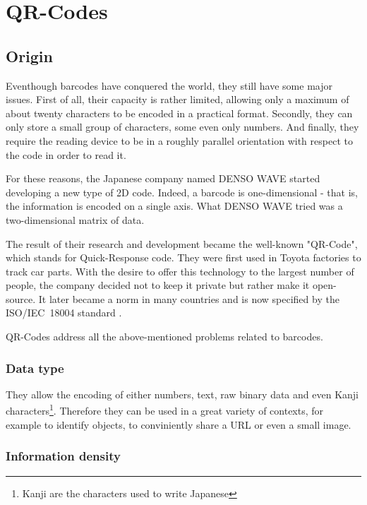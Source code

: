 \chapter{QR-Codes}
\label{chap:qr_origin}

\section{Origin}
\label{sec:qr_origin}

Eventhough barcodes have conquered the world, they still have some major issues.
First of all, their capacity is rather limited, allowing only a maximum of about twenty characters to be encoded in a practical format.
Secondly, they can only store a small group of characters, some even only numbers.
And finally, they require the reading device to be in a roughly parallel orientation with respect to the code in order to read it.

For these reasons, the Japanese company named DENSO WAVE started developing a new type of 2D code.
Indeed, a barcode is one-dimensional - that is, the information is encoded on a single axis.
What DENSO WAVE tried was a two-dimensional matrix of data.

The result of their research and development became the well-known "QR-Code", which stands for Quick-Response code. They were first used in Toyota factories to track car parts\cite{qrcode_history}.
With the desire to offer this technology to the largest number of people, the company decided not to keep it private but rather make it open-source.
It later became a norm in many countries and is now specified by the ISO/IEC~18004 standard \cite{ISO18004}.

QR-Codes address all the above-mentioned problems related to barcodes.

\subsection*{Data type}

They allow the encoding of either numbers, text, raw binary data and even Kanji characters\footnote{Kanji are the characters used to write Japanese}. Therefore they can be used in a great variety of contexts, for example to identify objects, to conviniently share a URL or even a small image.

\subsection*{Information density}

